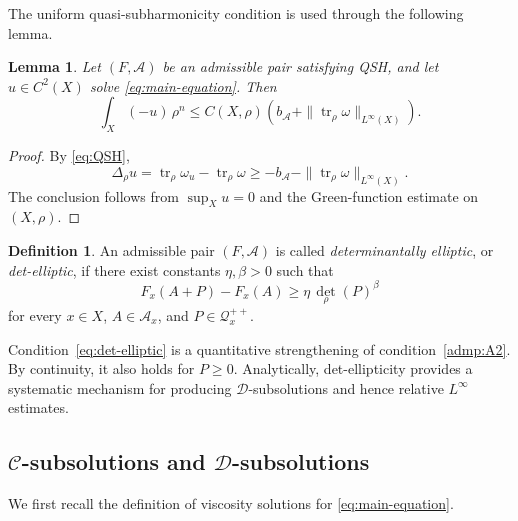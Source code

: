 \documentclass[oneside,english,letterpaper]{amsart}
\numberwithin{equation}{section}
\theoremstyle{plain}
\newtheorem{lem}[thm]{Lemma}
\theoremstyle{definition}
\newtheorem{defn}[thm]{Definition}
\theoremstyle{remark}
\begin{document}
The uniform quasi-subharmonicity condition is used through the
following lemma.
\begin{lem}
	\label{lem:admissible-L1}
	Let $(F,\mathcal A)$ be an admissible pair satisfying QSH,
	and let $u\in C^2(X)$ solve \eqref{eq:main-equation}. Then
	$$
	\int_X(-u)\,\rho^n
	\leq C(X,\rho)
	\left(b_{\mathcal A}
	+\|\operatorname{tr}_\rho\omega\|_{L^\infty(X)}\right).
	$$
\end{lem}

\begin{proof}
	By \eqref{eq:QSH},
	$$
	\Delta_\rho u
	=\operatorname{tr}_\rho\omega_u-\operatorname{tr}_\rho\omega
	\geq-b_{\mathcal A}
	-\|\operatorname{tr}_\rho\omega\|_{L^\infty(X)}.
	$$
	The conclusion follows from $\sup_Xu=0$ and the Green-function
	estimate on $(X,\rho)$.
\end{proof}


\begin{defn}
	\label{def:det-elliptic}
	An admissible pair $(F,\mathcal A)$ is called
	\emph{determinantally elliptic}, or \emph{det-elliptic}, if there
	exist constants $\eta,\beta>0$ such that
	\begin{equation}
		\label{eq:det-elliptic}
		F_x(A+P)-F_x(A)\geq\eta\,\det_\rho(P)^\beta
	\end{equation}
	for every $x\in X$, $A\in\mathcal A_x$, and
	$P\in\mathcal Q_x^{++}$.
\end{defn}

Condition~\eqref{eq:det-elliptic} is a quantitative strengthening of
condition~\ref{admp:A2}. By continuity, it also holds for $P\geq0$.
Analytically, det-ellipticity provides a systematic mechanism for producing
$\mathcal D$-subsolutions and hence relative $L^\infty$ estimates.





\subsection{\texorpdfstring{$\mathcal C$}{C}-subsolutions and
	\texorpdfstring{$\mathcal D$}{D}-subsolutions}
\label{subsec:D-subsolutions}

We first recall the definition of viscosity solutions for \eqref{eq:main-equation}.

\end{document}
